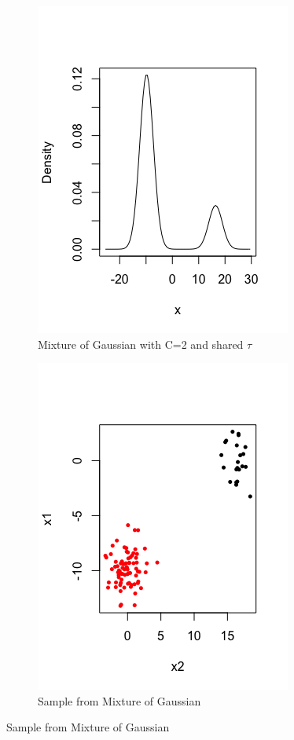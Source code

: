 \documentclass{article}
\begin{document}
\begin{figure}[h!]
    \begin{subfigure}{0.5\textwidth}
        \includegraphics[width=.7\textwidth]{Mix_gauss.png}
        \caption{Mixture of Gaussian with C=2 and shared $\tau$}
        \label{Mixture of gaussians}
    \end{subfigure}
    \begin{subfigure}{0.5\textwidth}
        \includegraphics[width=.7\textwidth]{Mix_gauss_2.png}
        \caption{Sample from Mixture of Gaussian}
        \label{Mixture of gaussians}
    \end{subfigure}
\end{figure}
\end{document}
